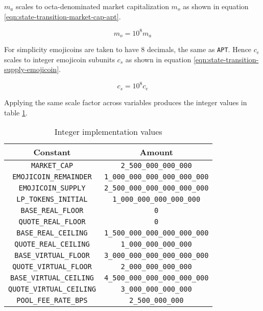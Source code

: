 \documentclass[table, twocolumn]{article}
\begin{document}
$m_a$ scales to octa-denominated \cite{octa} market capitalization $m_o$ as shown in
equation \ref{eqn:state-transition-market-cap-apt}.

\begin{equation} \label{eqn:state-transition-market-cap-apt}
  m_o = 10^8 m_a
\end{equation}

For simplicity emojicoins are taken to have 8 decimals, the same as \texttt{APT}. Hence
$c_e$ scales to integer emojicoin subunits $c_s$ as shown in equation
\ref{eqn:state-transition-supply-emojicoin}.

\begin{equation} \label{eqn:state-transition-supply-emojicoin}
  c_s = 10^8 c_e
\end{equation}

Applying the same scale factor across variables produces the integer values in table
\ref{tab:integer-implementation-values}.

\begin{table}[!htb]
  \centering
  \begin{tabular}{|c|c|}
    \hline \rowcolor{blue}
    Constant                         & Amount                           \\ \hline
    \texttt{MARKET\_CAP} &\texttt{2\_500\_000\_000\_000} \\ \hline
    \texttt{EMOJICOIN\_REMAINDER} &\texttt{1\_000\_000\_000\_000\_000\_000} \\ \hline
    \texttt{EMOJICOIN\_SUPPLY} &\texttt{2\_500\_000\_000\_000\_000\_000} \\ \hline
    \texttt{LP\_TOKENS\_INITIAL} &\texttt{1\_000\_000\_000\_000\_000} \\ \hline
    \texttt{BASE\_REAL\_FLOOR} &\texttt{0} \\ \hline
    \texttt{QUOTE\_REAL\_FLOOR} &\texttt{0} \\ \hline
    \texttt{BASE\_REAL\_CEILING} &\texttt{1\_500\_000\_000\_000\_000\_000} \\ \hline
    \texttt{QUOTE\_REAL\_CEILING} &\texttt{1\_000\_000\_000\_000} \\ \hline
    \texttt{BASE\_VIRTUAL\_FLOOR} &\texttt{3\_000\_000\_000\_000\_000\_000} \\ \hline
    \texttt{QUOTE\_VIRTUAL\_FLOOR} &\texttt{2\_000\_000\_000\_000} \\ \hline
    \texttt{BASE\_VIRTUAL\_CEILING} &\texttt{4\_500\_000\_000\_000\_000\_000} \\ \hline
    \texttt{QUOTE\_VIRTUAL\_CEILING} &\texttt{3\_000\_000\_000\_000} \\ \hline
    \texttt{POOL\_FEE\_RATE\_BPS} &\texttt{2\_500\_000\_000} \\ \hline
  \end{tabular}
  \caption{Integer implementation values}
  \label{tab:integer-implementation-values}
\end{table}
\end{document}
